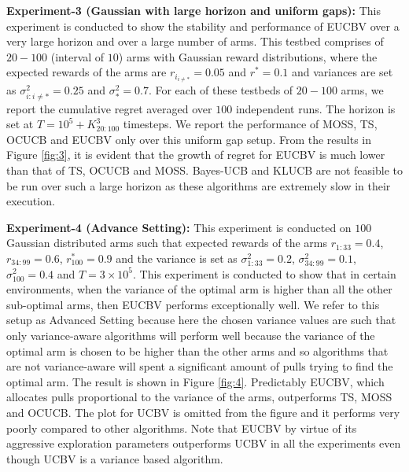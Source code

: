 \textbf{Experiment-3 (Gaussian with large horizon and uniform gaps):} This experiment is conducted to show the stability and performance of EUCBV over a very large horizon and over a large number of arms. This testbed comprises of $20-100$ (interval of $10$) arms with Gaussian reward distributions, where the expected rewards of the arms are $r_{i_{{i}\neq {*}}}=0.05$ and $r^{*}=0.1$ and variances are set as $\sigma_{i:i\neq *}^{2}=0.25$ and $\sigma_{*}^{2}=0.7$. For each of these testbeds of $20-100$ arms, we report the cumulative regret averaged over $100$ independent runs. The horizon is set at $T=10^{5} + K_{20:100}^{3}$ timesteps. We report the performance of MOSS, TS, OCUCB and EUCBV only over this uniform gap setup. From the results in Figure \ref{fig:3}, it is evident that the growth of regret for EUCBV  is much lower than that of TS, OCUCB and MOSS. Bayes-UCB and KLUCB are not feasible to be run over such a large horizon as these algorithms are extremely slow in their execution.


\textbf{Experiment-4 (Advance Setting):} This experiment is conducted on $100$ Gaussian distributed arms such that expected rewards of the arms $r_{1:33}=0.4$, $r_{34:99}=0.6$, $r^{*}_{100}=0.9$ and the variance is set as $\sigma_{1:33}^{2}=0.2$, $\sigma_{34:99}^{2}=0.1$,  $\sigma_{100}^{2}=0.4$ and $T=3\times 10^5$. This experiment is conducted to show that in certain environments, when the variance of the optimal arm is higher than all the other sub-optimal arms, then EUCBV performs exceptionally well. We refer to this setup as Advanced Setting because here the chosen variance values are such that only variance-aware algorithms will perform well because the variance of the optimal arm is chosen to be higher than the other arms and so algorithms that are not variance-aware will spent a significant amount of pulls trying to find the optimal arm. The result is shown in Figure \ref{fig:4}. Predictably EUCBV, which allocates pulls proportional to the variance of the arms, outperforms TS, MOSS and OCUCB. The plot for UCBV is omitted from the figure and it performs very poorly compared to other algorithms. Note that EUCBV by virtue of its aggressive exploration parameters outperforms UCBV in all the experiments even though UCBV is a variance based algorithm.



